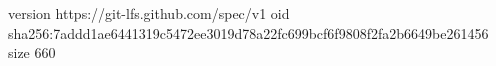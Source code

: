 version https://git-lfs.github.com/spec/v1
oid sha256:7addd1ae6441319c5472ee3019d78a22fc699bcf6f9808f2fa2b6649be261456
size 660
